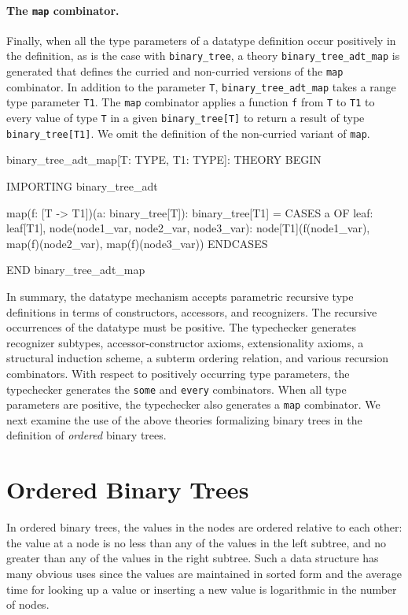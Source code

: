 \documentclass[11pt,twoside]{book}
\begin{document}
\subsubsection{The \texttt{map} combinator. } Finally, when all the type
parameters of a datatype definition 
occur positively in the definition, as is the case with \texttt{binary\_tree}, a theory \texttt{binary\_tree\_adt\_map} is generated
that defines 
the curried and non-curried versions of the \texttt{map}
combinator.  In addition to the parameter \texttt{T},
\texttt{binary\_tree\_adt\_map} takes a range type parameter \texttt{T1}.
The \texttt{map} combinator applies a function \texttt{f} from \texttt{T} to \texttt{T1} to every value of type \texttt{T} in a given \texttt{binary\_tree[T]} to
return a result of type \texttt{binary\_tree[T1]}.  
We omit the definition of the non-curried variant of \texttt{map}\@. 
\begin{session*}
binary_tree_adt_map[T: TYPE, T1: TYPE]: THEORY
  BEGIN
  
  IMPORTING binary_tree_adt
  
  map(f: [T -> T1])(a: binary_tree[T]): binary_tree[T1] =
    CASES a OF
      leaf: leaf[T1],
      node(node1_var, node2_var, node3_var):
          node[T1](f(node1_var),
                   map(f)(node2_var), map(f)(node3_var))
      ENDCASES
  
  END binary_tree_adt_map
\end{session*}

In summary, the datatype mechanism accepts parametric recursive type
definitions in terms of constructors, accessors, and recognizers.  The
recursive occurrences of the datatype must be positive.  The typechecker
generates recognizer subtypes, accessor-constructor axioms, extensionality
axioms, a structural induction scheme, a subterm ordering relation, and
various recursion combinators.  With respect to positively occurring type
parameters, the typechecker generates the \texttt{some} and \texttt{every}
combinators.  When all type parameters are positive, the typechecker also
generates a \texttt{map} combinator.  We next examine the use of the
above theories formalizing binary trees 
in the definition of \emph{ordered} binary trees.

\chapter{Ordered Binary Trees}\label{ordered-binary-trees}

In ordered binary trees, the values in the nodes are ordered relative
to each other: the value at a node is no less than any of the values
in the left subtree, and no greater than any of the values in the
right subtree.  Such a data structure has many obvious uses since the
values are maintained in sorted form and the average time for looking
up a value or inserting a new value is logarithmic in the number of
nodes.
\end{document}
